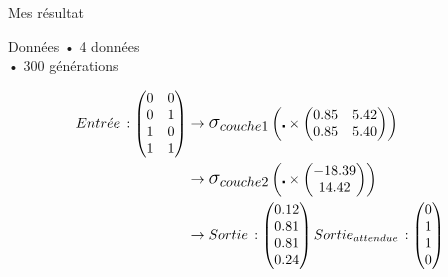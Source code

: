 \begin{frame}{Mes résultat}
	\begin{block}{Données}
		• 4 données \\
		• 300 générations
	\end{block}
	\begin{align*}
		Entr\acute{e} e\, :
		\begin{pmatrix}
			0 & 0 \\
			0 & 1 \\
			1 & 0 \\
			1 & 1
		\end{pmatrix}
		 & \to
		\mathlarger{\mathlarger{\sigma_{couche1}}}
		\left( \centerdot \times
		\begin{pmatrix}
				0.85 & 5.42 \\
				0.85 & 5.40 
			\end{pmatrix}
		\right) \\
		 & \to
		\mathlarger{\mathlarger{\sigma_{couche2}}}
		\left( \centerdot \times
		\begin{pmatrix}
				-18.39 \\
				14.42  
			\end{pmatrix}
		\right) \\
		 & \to
		Sortie\, :
		\begin{pmatrix}
			0.12 \\
			0.81 \\
			0.81 \\
			0.24
		\end{pmatrix}
		Sortie_{attendue}\, :
		\begin{pmatrix}
			0 \\
			1 \\
			1 \\
			0
		\end{pmatrix}
	\end{align*}
\end{frame}
